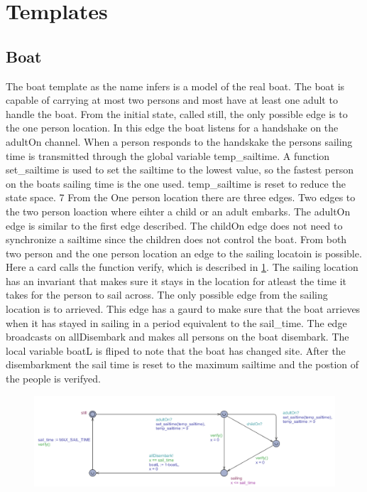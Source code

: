 \section{Templates}




\subsection{Boat}
The boat template as the name infers is a model of the real boat. 
The boat is capable of carrying at most two persons and most have at least one adult to handle the boat. 
From the initial state, called still, the only possible edge is to the one person location. 
In this edge the boat listens for a handshake on the adultOn channel. 
When a person responds to the handskake the persons sailing time is transmitted through the global variable temp_sailtime. 
A function set_sailtime is used to set the sailtime to the lowest value, so the fastest person on the boats sailing time is the one used. 
temp_sailtime is reset to reduce the state space.
7 From the One person location there are three edges. 
Two edges to the two person loaction where eihter a child or an adult embarks. 
The adultOn edge is similar to the first edge described. 
The childOn edge does not need to synchronize a sailtime since the children does not control the boat. 
From both two person and the one person location an edge to the sailing locatoin is possible. 
Here a card calls the function verify, which is described in \ref{}. 
The sailing location has an invariant that makes sure it stays in the location for atleast the time it takes for the person to sail across. 
The only possible edge from the sailing location is to arrieved. 
This edge has a gaurd to make sure that the boat arrieves when it has stayed in sailing in a period equivalent to the sail_time. 
The edge broadcasts on allDisembark and makes all persons on the boat disembark. 
The local variable boatL is fliped to note that the boat has changed site. 
After the disembarkment the sail time is reset to the maximum sailtime and the postion of the people is verifyed. 
\begin{figure}%
\includegraphics[width=\columnwidth]{pictures/boat.png}%
\caption{}%
\label{}%
\end{figure}
















